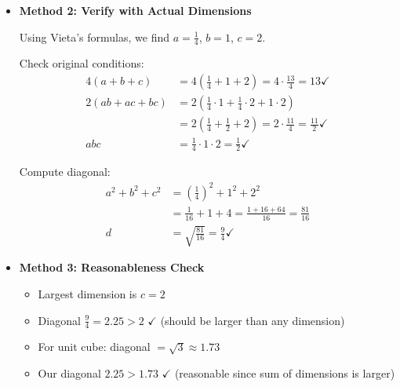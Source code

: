 \documentclass[12pt]{article}
\begin{document}
\begin{verificationbox}
\begin{itemize}[leftmargin=*]
    \begin{align*}
        (a+b+c)^2 &= \left(\frac{13}{4}\right)^2 = \frac{169}{16}\\
        2(ab+ac+bc) &= 2 \cdot \frac{11}{4} = \frac{22}{4} = \frac{88}{16}\\
        a^2+b^2+c^2 &= \frac{169}{16} - \frac{88}{16} = \frac{81}{16}\\
        \sqrt{\frac{81}{16}} &= \frac{\sqrt{81}}{\sqrt{16}} = \frac{9}{4}
    \end{align*}
    
    \item \textbf{Method 2: Verify with Actual Dimensions}
    
    Using Vieta's formulas, we find $a=\frac{1}{4}$, $b=1$, $c=2$.
    
    Check original conditions:
    \begin{align*}
        4(a+b+c) &= 4\left(\frac{1}{4}+1+2\right) = 4 \cdot \frac{13}{4} = 13 \checkmark\\
        2(ab+ac+bc) &= 2\left(\frac{1}{4} \cdot 1 + \frac{1}{4} \cdot 2 + 1 \cdot 2\right)\\
        &= 2\left(\frac{1}{4} + \frac{1}{2} + 2\right) = 2 \cdot \frac{11}{4} = \frac{11}{2} \checkmark\\
        abc &= \frac{1}{4} \cdot 1 \cdot 2 = \frac{1}{2} \checkmark
    \end{align*}
    
    Compute diagonal:
    \begin{align*}
        a^2+b^2+c^2 &= \left(\frac{1}{4}\right)^2 + 1^2 + 2^2\\
        &= \frac{1}{16} + 1 + 4 = \frac{1+16+64}{16} = \frac{81}{16}\\
        d &= \sqrt{\frac{81}{16}} = \frac{9}{4} \checkmark
    \end{align*}
    
    \item \textbf{Method 3: Reasonableness Check}
    
    \begin{itemize}
        \item Largest dimension is $c=2$
        \item Diagonal $\frac{9}{4} = 2.25 > 2$ $\checkmark$ (should be larger than any dimension)
        \item For unit cube: diagonal $= \sqrt{3} \approx 1.73$
        \item Our diagonal $2.25 > 1.73$ $\checkmark$ (reasonable since sum of dimensions is larger)
    \end{itemize}
\end{itemize}
\end{verificationbox}
\end{document}
